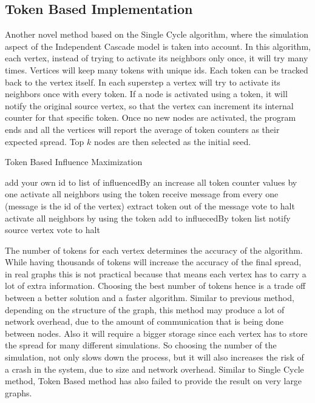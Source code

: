 \documentclass[english]{tktltiki}
\begin{document}
\subsection{Token Based Implementation}
Another novel method based on the Single Cycle algorithm, where the simulation aspect of the Independent Cascade model is taken into account. 
In this algorithm, each vertex, instead of trying to activate its neighbors only once, it will try many times. 
Vertices will keep many tokens with unique ids. 
Each token can be tracked back to the vertex itself. 
In each superstep a vertex will try to activate its neighbors once with every token. 
If a node is activated using a token, it will notify the original source vertex, so that the vertex can increment its internal counter for that specific token. 
Once no new nodes are activated, the program ends and all the vertices will report the average of token counters as their expected spread. Top $k$ nodes are then selected as the initial seed.
\begin{algorithm}[ht!]
\caption{Token Based Influence Maximization}
\begin{algorithmic}
	\State add your own id to list of influencedBy an increase all token counter values by one
		\State activate all neighbors using the token
	\EndFor
\Else
	\State receive message from every one (message is the id of the vertex)
		\State extract token out of the message
			\State vote to halt
		\Else
			\State activate all neighbors by using the token
			\State add to influecedBy token list 
			\State notify source vertex
			\State vote to halt
		\EndIf
		
	\EndFor
\EndIf
\end{algorithmic}
\end{algorithm}
The number of tokens for each vertex determines the accuracy of the algorithm.
While having thousands of tokens will increase the accuracy of the final spread, in real graphs this is not practical because that means each vertex has to carry a lot of extra information. 
Choosing the best number of tokens hence is a trade off between a better solution and a faster algorithm. 
Similar to previous method, depending on the structure of the graph, this method may produce a lot of network overhead, due to the amount of communication that is being done between nodes. 
Also it will require a bigger storage since each vertex has to store the spread for many different simulations. 
So choosing the number of the simulation, not only slows down the process, but it will also increases the risk of a crash in the system, due to size and network overhead. 
Similar to Single Cycle method, Token Based method has also failed to provide the result on very large graphs.
\end{document}
